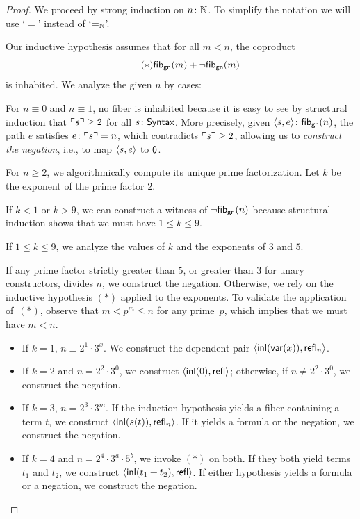 \begin{proof}
    We proceed by strong induction on $n\colon\N$. To simplify the notation we will use `$=$' instead of `$\mathrel{=_{\mathbb{N}}}$'.
    
    Our inductive hypothesis assumes that for all $m<n$, the coproduct
    \[\tag{$\ast$}
        \mathsf{fib}_{\mathsf{gn}}(m)+\neg\mathsf{fib}_{\mathsf{gn}}(m)
    \]
    is inhabited. We analyze the given $n$ by cases:

    For $n\equiv0$ and $n\equiv1$, no fiber is inhabited because it is easy to see by structural induction that $\ulcorner s\urcorner\ge2$ for all $s\colon\fun{Syntax}$. More precisely, given $\dep{s,e}\colon\fun{fib}_{\fun{gn}}(n)$, the path $e$ satisfies $e\colon\gn{s}=n$, which contradicts $\ulcorner s\urcorner\ge2$, allowing us to \textit{construct the negation}, i.e., to map $\langle s,e\rangle$ to $\mathsf{0}$.

    For $n\ge2$, we algorithmically compute its unique prime factorization. Let $k$ be the exponent of the prime factor $2$.
    
    If $k<1$ or $k>9$, we can construct a witness of $\neg\mathsf{fib}_{\mathsf{gn}}(n)$ because structural induction shows that we must have $1\le k\le 9$.

    If $1\le k\le9$, we analyze the values of $k$ and the exponents of $3$ and $5$.
    
    If any prime factor strictly greater than $5$, or greater than $3$ for unary constructors, divides $n$, we construct the negation. Otherwise, we rely on the  inductive hypothesis $(\ast)$ applied to the exponents. To validate the application of~$(\ast)$, observe that $m<p^m\le n$ for any prime~$p$, which implies that we must have $m<n$.
    
    \begin{itemize}
        \item If $k=1$, $n\equiv2^1\cdot3^x$. We construct the dependent pair $\langle\mathsf{inl}(\mathsf{var}(x)),\mathsf{refl}_n\rangle$.
        
        \item If $k=2$ and $n=2^2\cdot3^0$, we construct $\langle\mathsf{inl}(0), \mathsf{refl}\rangle$; otherwise, if $n\ne 2^2\cdot3^0$, we construct the negation.
        
        \item If $k=3$, $n=2^3\cdot3^m$. If the induction hypothesis yields a fiber containing a term $t$, we construct $\langle\mathsf{inl}(s(t)),\mathsf{refl}_n\rangle$. If it yields a formula or the negation, we construct the negation.
        
        \item If $k=4$ and $n=2^4\cdot3^a\cdot 5^b$, we invoke $(\ast)$ on both. If they both yield terms $t_1$ and $t_2$, we construct $\langle\mathsf{inl}(t_1+t_2),\mathsf{refl}\rangle$. If either hypothesis yields a formula or a negation, we construct the negation.
        

\end{itemize}
\end{proof}

